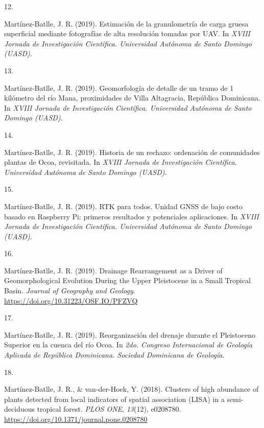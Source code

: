 \documentclass[10pt,a4paper,]{article}
\newlength{\cslhangindent}
\newlength{\csllabelwidth}
\newcommand{\CSLLeftMargin}[1]{\parbox[t]{\csllabelwidth}{\hfill #1~}}
\newcommand{\CSLRightInline}[1]{\parbox[t]{\linewidth - \cslhangindent - \csllabelwidth}{#1}\vspace{0.8ex}}
\begin{document}
\leavevmode\hypertarget{ref-Jose_Ramon_Martinez-Batlle_108106017}{}%
\CSLLeftMargin{12. }
\CSLRightInline{Martínez-Batlle, J. R. (2019). Estimación de la
granulometría de carga gruesa superficial mediante fotografías de alta
resolución tomadas por UAV. In \emph{XVIII Jornada de Investigación
Científica. Universidad Autónoma de Santo Domingo (UASD)}.}

\leavevmode\hypertarget{ref-Jose_Ramon_Martinez-Batlle_108105769}{}%
\CSLLeftMargin{13. }
\CSLRightInline{Martínez-Batlle, J. R. (2019). Geomorfología de detalle
de un tramo de 1 kilómetro del río Mana, proximidades de Villa
Altagracia, República Dominicana. In \emph{XVIII Jornada de
Investigación Científica. Universidad Autónoma de Santo Domingo
(UASD)}.}

\leavevmode\hypertarget{ref-Jose_Ramon_Martinez-Batlle_108106039}{}%
\CSLLeftMargin{14. }
\CSLRightInline{Martínez-Batlle, J. R. (2019). Historia de un rechazo:
ordenación de comunidades plantas de Ocoa, revisitada. In \emph{XVIII
Jornada de Investigación Científica. Universidad Autónoma de Santo
Domingo (UASD)}.}

\leavevmode\hypertarget{ref-Jose_Ramon_Martinez-Batlle_108106059}{}%
\CSLLeftMargin{15. }
\CSLRightInline{Martínez-Batlle, J. R. (2019). RTK para todos. Unidad
GNSS de bajo costo basado en Raspberry Pi: primeros resultados y
potenciales aplicaciones. In \emph{XVIII Jornada de Investigación
Científica. Universidad Autónoma de Santo Domingo (UASD)}.}

\leavevmode\hypertarget{ref-Jose_Ramon_Martinez-Batlle_76604230}{}%
\CSLLeftMargin{16. }
\CSLRightInline{Martínez-Batlle, J. R. (2019). Drainage Rearrangement as
a Driver of Geomorphological Evolution During the Upper Pleistocene in a
Small Tropical Basin. \emph{Journal of Geography and Geology}.
\url{https://doi.org/10.31223/OSF.IO/PFZVQ}}

\leavevmode\hypertarget{ref-Jose_Ramon_Martinez-Batlle_108096060}{}%
\CSLLeftMargin{17. }
\CSLRightInline{Martínez-Batlle, J. R. (2019). Reorganización del
drenaje durante el Pleistoceno Superior en la cuenca del río Ocoa. In
\emph{2do. Congreso Internacional de Geología Aplicada de República
Dominicana. Sociedad Dominicana de Geología}.}

\leavevmode\hypertarget{ref-Mart_nez_Batlle_2018}{}%
\CSLLeftMargin{18. }
\CSLRightInline{Martínez-Batlle, J. R., \& van-der-Hoek, Y. (2018).
Clusters of high abundance of plants detected from local indicators of
spatial association (LISA) in a semi-deciduous tropical forest.
\emph{PLOS ONE}, \emph{13}(12), e0208780.
\url{https://doi.org/10.1371/journal.pone.0208780}}
\end{document}
